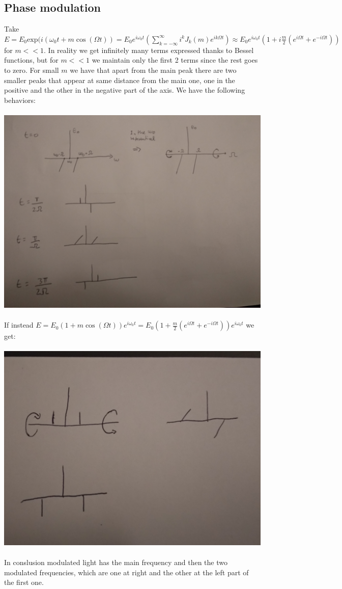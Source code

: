 \documentclass[10pt,a4paper]{book}
\begin{document}
\subsection{Phase modulation}
Take $E=E_0\text{exp}(i(\omega_0t+m\cos(\Omega t))=E_0e^{i\omega_0 t}(\sum_{k=-\infty}^{\infty} i^k J_k(m)e^{ik\Omega t})\approx E_0e^{i\omega_0 t}(1+i\frac{m}{2}(e^{i\Omega t}+e^{-i\Omega t}))$ for $m<<1$. In reality we get infinitely many terms expressed thanks to Bessel functions, but for $m<<1$ we maintain only the first 2 terms since the rest goes to zero. For small $m$ we have that apart from the main peak there are two smaller peaks that appear at same distance from the main one, one in the positive and the other in the negative part of the axis.
We have the following behaviors:\\\\
\includegraphics[scale=0.07]{fig3}\\\\
If instead $E=E_0(1+m\cos(\Omega t))e^{i\omega_0 t}=E_0(1+\frac{m}{2}(e^{i\Omega t}+e^{-i\Omega t}))e^{i\omega_0 t}$ we get:\\\\
\includegraphics[scale=0.1]{fig4}\\\\
In conslusion modulated light has the main frequency and then the two modulated frequencies, which are one at right and the other at the left part of the first one. 
\end{document}
